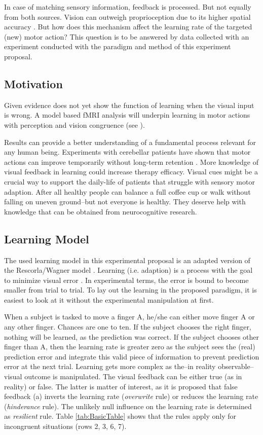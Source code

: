\documentclass[man]{apa7}
\begin{document}
In case of matching sensory information, feedback is processed. But not equally from both sources. Vision can outweigh proprioception due to its higher spatial accuracy \parencite{Limanowski2016}. But how does this mechanism affect the learning rate of the targeted (new) motor action? This question is to be answered by data collected with an experiment conducted with the paradigm and method of this experiment proposal.

\subsection{Motivation}

Given evidence does not yet show the function of learning when the visual input is wrong. A model based fMRI analysis will underpin learning in motor actions with perception and vision congruence (see \cite{Limanowski2016}).

Results can provide a better understanding of a fundamental process relevant for any human being. Experiments with cerebellar patients have shown that motor actions can improve temporarily without long-term retention \parencite{seidler2013motor}. More knowledge of visual feedback in learning could increase therapy efficacy. Visual cues might be a crucial way to support the daily-life of patients that struggle with sensory motor adaption. After all healthy people can balance a full coffee cup or walk without falling on uneven ground–but not everyone is healthy. They deserve help with knowledge that can be obtained from neurocognitive research.


\subsection{Learning Model}

The used learning model in this experimental proposal is an adapted version of the Rescorla/Wagner model \parencite{Rescorla1972ATO}. Learning (i.e. adaption) is a process with the goal to minimize visual error \parencite{Tsay2022}. In experimental terms, the error is bound to become smaller from trial to trial. To lay out the learning in the proposed paradigm, it is easiest to look at it without the experimental manipulation at first.

When a subject is tasked to move a finger A, he/she can either move finger A or any other finger. Chances are one to ten. If the subject chooses the right finger, nothing will be learned, as the prediction was correct. If the subject chooses other finger than A, then the learning rate is greater zero as the subject sees the (real) prediction error and integrate this valid piece of information to prevent prediction error at the next trial. Learning gets more complex as the–in reality observable–visual outcome is manipulated. The visual feedback can be either true (as in reality) or false. The latter is matter of interest, as it is proposed that false feedback (a) inverts the learning rate (\textit{overwrite} rule) or reduces the learning rate (\textit{hinderance} rule). The unlikely null influence on the learning rate is determined as \textit{resilient} rule. Table \ref{tab:BasicTable} shows that the rules apply only for incongruent situations (rows 2, 3, 6, 7).
\end{document}
